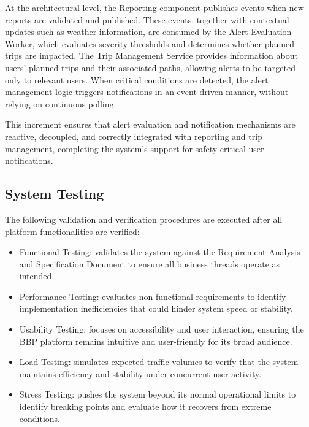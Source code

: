 At the architectural level, the Reporting component publishes events when new reports are validated and published. These events, together with contextual updates such as weather information, are consumed by the Alert Evaluation Worker, which evaluates severity thresholds and determines whether planned trips are impacted. The Trip Management Service provides information about users’ planned trips and their associated paths, allowing alerts to be targeted only to relevant users. When critical conditions are detected, the alert management logic triggers notifications in an event-driven manner, without relying on continuous polling.

This increment ensures that alert evaluation and notification mechanisms are reactive, decoupled, and correctly integrated with reporting and trip management, completing the system’s support for safety-critical user notifications.

\subsection{System Testing}
The following validation and verification procedures are executed after all platform functionalities are verified:
\begin{itemize}
    \item Functional Testing: validates the system against the Requirement Analysis and Specification Document to ensure all business threads operate as intended.
    \item Performance Testing: evaluates non-functional requirements to identify implementation inefficiencies that could hinder system speed or stability.
    \item Usability Testing: focuses on accessibility and user interaction, ensuring the BBP platform remains intuitive and user-friendly for its broad audience.
    \item Load Testing: simulates expected traffic volumes to verify that the system maintains efficiency and stability under concurrent user activity.
    \item Stress Testing: pushes the system beyond its normal operational limits to identify breaking points and evaluate how it recovers from extreme conditions.
\end{itemize}